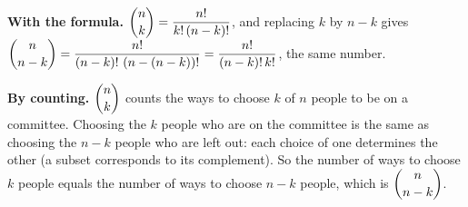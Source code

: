 \textbf{With the formula.} $\dbinom nk=\dfrac{n!}{k!\,(n-k)!}$, and replacing $k$ by $n-k$ gives $\dbinom n{n-k}=\dfrac{n!}{(n-k)!\,\left(n-(n-k)\right)!}=\dfrac{n!}{(n-k)!\,k!}$, the same number.

\textbf{By counting.} $\dbinom nk$ counts the ways to choose $k$ of $n$ people to be on a committee. Choosing the $k$ people who are on the committee is the same as choosing the $n-k$ people who are left out: each choice of one determines the other (a subset corresponds to its complement). So the number of ways to choose $k$ people equals the number of ways to choose $n-k$ people, which is $\dbinom n{n-k}$.
